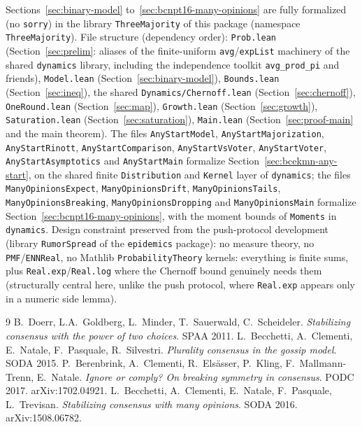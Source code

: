 Sections~\ref{sec:binary-model} to~\ref{sec:bcnpt16-many-opinions} are fully formalized (no
\texttt{sorry}) in the library \texttt{ThreeMajority} of this package (namespace
\texttt{ThreeMajority}). File structure (dependency order):
\texttt{Prob.lean} (Section~\ref{sec:prelim}: aliases of the finite-uniform
\texttt{avg}/\texttt{expList} machinery of the shared \texttt{dynamics}
library, including the independence toolkit \texttt{avg\_prod\_pi} and
friends), \texttt{Model.lean}
(Section~\ref{sec:binary-model}), \texttt{Bounds.lean} (Section~\ref{sec:ineq}),
the shared \texttt{Dynamics/Chernoff.lean} (Section~\ref{sec:chernoff}),
\texttt{OneRound.lean}
(Section~\ref{sec:map}), \texttt{Growth.lean} (Section~\ref{sec:growth}),
\texttt{Saturation.lean} (Section~\ref{sec:saturation}), \texttt{Main.lean}
(Section~\ref{sec:proof-main} and the main theorem). The files
\texttt{AnyStartModel}, \texttt{AnyStartMajorization}, \texttt{AnyStartRinott},
\texttt{AnyStartComparison}, \texttt{AnyStartVsVoter}, \texttt{AnyStartVoter},
\texttt{AnyStartAsymptotics} and \texttt{AnyStartMain} formalize
Section~\ref{sec:bcekmn-any-start}, on the shared finite \texttt{Distribution} and
\texttt{Kernel} layer of \texttt{dynamics}; the files \texttt{ManyOpinionsExpect},
\texttt{ManyOpinionsDrift}, \texttt{ManyOpinionsTails},
\texttt{ManyOpinionsBreaking}, \texttt{ManyOpinionsDropping} and \texttt{ManyOpinionsMain}
formalize Section~\ref{sec:bcnpt16-many-opinions}, with the moment bounds of
\texttt{Moments} in \texttt{dynamics}. Design constraint
preserved from the push-protocol development (library \texttt{RumorSpread} of the
\texttt{epidemics} package): no measure theory, no
\texttt{PMF}/\texttt{ENNReal}, no Mathlib \texttt{ProbabilityTheory}
kernels: everything is finite sums, plus \texttt{Real.exp}/\texttt{Real.log}
where the Chernoff bound genuinely needs them (structurally central here,
unlike the push protocol, where \texttt{Real.exp} appears only in a numeric
side lemma).

\begin{thebibliography}{9}
 B.~Doerr, L.A.~Goldberg, L.~Minder, T.~Sauerwald,
C.~Scheideler. \emph{Stabilizing consensus with the power of two choices}.
SPAA 2011.
 L.~Becchetti, A.~Clementi, E.~Natale, F.~Pasquale,
R.~Silvestri. \emph{Plurality consensus in the gossip model}. SODA 2015.
 P.~Berenbrink, A.~Clementi, R.~Elsässer, P.~Kling,
F.~Mallmann-Trenn, E.~Natale. \emph{Ignore or comply? On breaking symmetry in consensus}.
PODC 2017. arXiv:1702.04921.
 L.~Becchetti, A.~Clementi, E.~Natale, F.~Pasquale, L.~Trevisan.
\emph{Stabilizing consensus with many opinions}. SODA 2016. arXiv:1508.06782.
\end{thebibliography}
